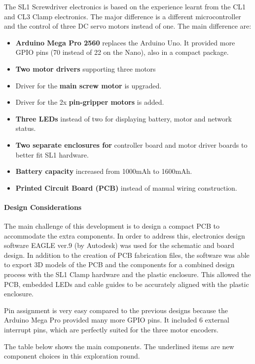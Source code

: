 The SL1 Screwdriver electronics is based on the experience learnt from the CL1 and CL3 Clamp electronics. The major difference is a different microcontroller and the control of three DC servo motors instead of one. The main difference are:
\begin{itemize}
    \item \textbf{Arduino Mega Pro 2560} replaces the Arduino Uno. It provided more GPIO pins (70 instead of 22 on the Nano), also in a compact package.
    \item \textbf{Two motor drivers} supporting three motors
    \item Driver for the \textbf{main screw motor} is upgraded.
    \item Driver for the 2x \textbf{pin-gripper motors} is added.
    \item \textbf{Three LEDs} instead of two for displaying battery, motor and network status.
    \item \textbf{Two separate enclosures for }controller board and motor driver boards to better fit SL1 hardware.
    \item \textbf{Battery capacity} increased from 1000mAh to 1600mAh.
    \item \textbf{Printed Circuit Board (PCB)} instead of manual wiring construction.
\end{itemize}

\paragraph{Design Considerations}
The main challenge of this development is to design a compact PCB to accommodate the extra components. In order to address this, electronics design software EAGLE ver.9 (by Autodesk) was used for the schematic and board design. In addition to the creation of PCB fabrication files, the software was able to export 3D models of the PCB and the components for a combined design process with the SL1 Clamp hardware and the plastic enclosure. This allowed the PCB, embedded LEDs and cable guides to be accurately aligned with the plastic enclosure.

Pin assignment is very easy compared to the previous designs because the Arduino Mega Pro provided many more GPIO pins. It included 6 external interrupt pins, which are perfectly suited for the three motor encoders.  

The table below shows the main components. The underlined items are new component choices in this exploration round. 

